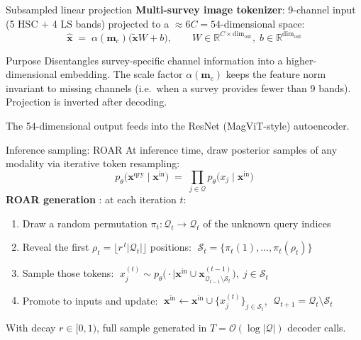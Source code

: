 \documentclass[10pt]{beamer}
\begin{document}
\begin{frame}{Subsampled linear projection}
  \textbf{Multi-survey image tokenizer}: 9-channel input (5 HSC $+$ 4 LS bands)
  projected to a ${\approx}6C = 54$-dimensional space:
  \begin{equation*}
    \hat{\mathbf{x}} \;=\; \alpha(\mathbf{m}_c)\bigl(\tilde{\mathbf{x}}W + b\bigr),
    \qquad
    W\!\in\!\mathbb{R}^{C\times\mathrm{dim}_\mathrm{out}},\;
    b\!\in\!\mathbb{R}^{\mathrm{dim}_\mathrm{out}}
  \end{equation*}
  \begin{alertblock}{Purpose}
    Disentangles survey-specific channel information into a higher-dimensional embedding.
    The scale factor $\alpha(\mathbf{m}_c)$ keeps the feature norm invariant to missing
    channels (i.e.\ when a survey provides fewer than 9 bands).
    Projection is inverted after decoding.
  \end{alertblock}
  \vspace{0.3em}
  The 54-dimensional output feeds into the ResNet (MagViT-style) autoencoder.
\end{frame}

\begin{frame}{Inference sampling: ROAR}
  At inference time, draw posterior samples of any modality via iterative token resampling:
  \begin{equation*}
    p_\theta\!\bigl(\mathbf{x}^{\mathrm{qry}} \mid \mathbf{x}^{\mathrm{in}}\bigr)
    \;=\;
    \prod_{j\in\mathcal{Q}}
    p_\theta\!\bigl(x_j \mid \mathbf{x}^{\mathrm{in}}\bigr)
  \end{equation*}
  \textbf{ROAR generation} \parencite{mizrahi2023}: at each iteration $t$:
  \begin{enumerate}\small
    \item Draw a random permutation $\pi_t\!:\mathcal{Q}_t\!\to\!\mathcal{Q}_t$ of the unknown query indices
    \item Reveal the first $\rho_t = \lfloor r^{\,t}|\mathcal{Q}_t|\rfloor$ positions:
          $\;\mathcal{S}_t = \{\pi_t(1),\dots,\pi_t(\rho_t)\}$
    \item Sample those tokens:
          $\;x_j^{(t)} \sim p_\theta\!\bigl(\cdot \mid \mathbf{x}^{\mathrm{in}} \cup
          \mathbf{x}^{(t-1)}_{\mathcal{Q}_{t-1}\setminus\mathcal{S}_t}\bigr),\; j\in\mathcal{S}_t$
    \item Promote to inputs and update:
          $\;\mathbf{x}^{\mathrm{in}} \leftarrow \mathbf{x}^{\mathrm{in}} \cup \{x_j^{(t)}\}_{j\in\mathcal{S}_t}$,
          $\;\mathcal{Q}_{t+1} = \mathcal{Q}_t\setminus\mathcal{S}_t$
  \end{enumerate}
  With decay $r\in[0,1)$, full sample generated in $T=\mathcal{O}(\log|\mathcal{Q}|)$ decoder calls.
\end{frame}
\end{document}
